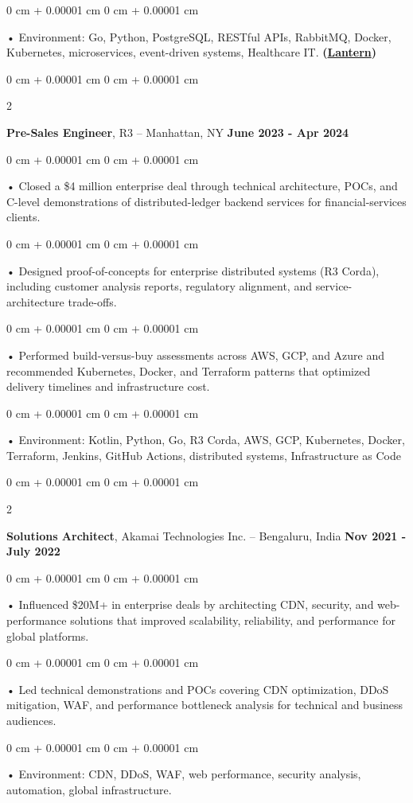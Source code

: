 \documentclass[10pt, letterpaper]{article}
\newenvironment{onecolentry}{
    \begin{adjustwidth}{
        0 cm + 0.00001 cm
    }{
        0 cm + 0.00001 cm
    }
}{
    \end{adjustwidth}
} %
\newenvironment{twocolentry}[2][]{
    \onecolentry
    \def\secondColumn{#2}
    \setcolumnwidth{\fill, 4.5 cm}
    \begin{paracol}{2}
}{
    \switchcolumn \raggedleft \secondColumn
    \end{paracol}
    \endonecolentry
} %
\begin{document}
        \begin{onecolentry}
             • Environment: Go, Python, PostgreSQL, RESTful APIs, RabbitMQ, Docker, Kubernetes, microservices, event-driven systems, Healthcare IT. \textbf{(\href{https://lantern.healthit.gov/?tab=dashboard_tab}{Lantern})}
        \end{onecolentry}
        \vspace{0.1cm}

        \begin{twocolentry}{
            \textbf{June 2023 - Apr 2024}
        }
            \textbf{Pre-Sales Engineer}, R3 -- Manhattan, NY\end{twocolentry}


        \begin{onecolentry}
             • Closed a \$4 million enterprise deal through technical architecture, POCs, and C-level demonstrations of distributed-ledger backend services for financial-services clients.
        \end{onecolentry}
        \begin{onecolentry}
             • Designed proof-of-concepts for enterprise distributed systems (R3 Corda), including customer analysis reports, regulatory alignment, and service-architecture trade-offs.
        \end{onecolentry}
        \begin{onecolentry}
             • Performed build-versus-buy assessments across AWS, GCP, and Azure and recommended Kubernetes, Docker, and Terraform patterns that optimized delivery timelines and infrastructure cost.
        \end{onecolentry}
        \begin{onecolentry}
             • Environment: Kotlin, Python, Go, R3 Corda, AWS, GCP, Kubernetes, Docker, Terraform, Jenkins, GitHub Actions, distributed systems, Infrastructure as Code
        \end{onecolentry}
        \vspace{0.1cm}

        \begin{twocolentry}{
            \textbf{Nov 2021 - July 2022}
        }
            \textbf{Solutions Architect}, Akamai Technologies Inc. -- Bengaluru, India \end{twocolentry}
        \begin{onecolentry}
            • Influenced \$20M+ in enterprise deals by architecting CDN, security, and web-performance solutions that improved scalability, reliability, and performance for global platforms.
        \end{onecolentry}
        \begin{onecolentry}
            • Led technical demonstrations and POCs covering CDN optimization, DDoS mitigation, WAF, and performance bottleneck analysis for technical and business audiences.
        \end{onecolentry}
        \begin{onecolentry}
             • Environment: CDN, DDoS, WAF, web performance, security analysis, automation, global infrastructure.
        \end{onecolentry}
\end{document}
